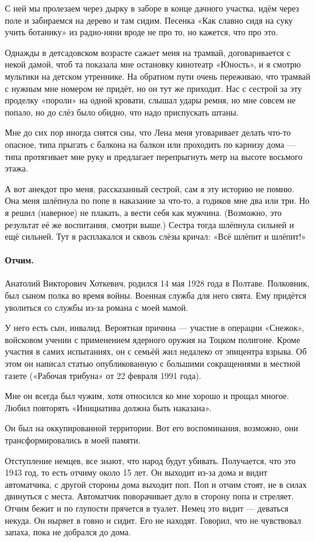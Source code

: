 \documentclass{book}
\begin{document}
С ней мы пролезаем через дырку в заборе в конце дачного участка, идём через поле и забираемся на дерево и там сидим.
Песенка «Как славно сидя на суку учить ботанику» из радио-няни вроде не про то, но кажется, что про это.

Однажды в детсадовском возрасте сажает меня на трамвай,
договаривается с некой дамой, чтоб та показала мне остановку кинотеатр «Юность», 
и я смотрю мультики на детском утреннике.
На обратном пути очень переживаю, что трамвай с нужным мне номером не придёт, но он тут же приходит.
Нас с сестрой за эту проделку «пороли» на одной кровати, слышал удары ремня, но мне совсем не попало, но до слёз было обидно, что надо приспускать штаны.

Мне до сих пор иногда снятся сны, что Лена меня уговаривает делать что-то опасное, типа прыгать с балкона на балкон или проходить по карнизу дома --- типа протягивает мне руку и предлагает перепрыгнуть метр на высоте восьмого этажа.

А вот анекдот про меня, рассказанный сестрой, сам я эту историю не помню.
Она меня шлёпнула по попе в наказание за что-то, а годиков мне два или три.
Но я решил (наверное) не плакать, а вести себя как мужчина.
(Возможно, это результат её же воспитания, смотри выше.)
Сестра тогда шлёпнула сильней и ещё сильней.
Тут я расплакался и сквозь слёзы кричал: «Всё шлёпит и шлёпит!»

\paragraph{Отчим.}
Анатолий Викторович Хоткевич, родился 14 мая 1928 года в Полтаве.
Полковник, был сыном полка во время войны.
Военная служба для него свята.
Ему придётся уволиться со службы из-за романа с моей мамой.

У него есть сын, инвалид.
Вероятная причина --- участие в операции «Снежок», войсковом учении с применением ядерного оружия на Тоцком полигоне.
Кроме участия в самих испытаниях, он с семьёй жил недалеко от эпицентра взрыва.
Об этом он написал статью опубликованную с большими сокращениями в местной газете («Рабочая трибуна» от 22 февраля 1991 года).

Мне он всегда был чужим, хотя относился ко мне хорошо и прощал многое.
Любил повторять «Инициатива должна быть наказана».

Он был на оккупированной территории.
Вот его воспоминания, возможно, они трансформировались в моей памяти.

Отступление немцев, все знают, что народ будут убивать.
Получается, что это 1943 год, то есть отчиму около 15 лет.
Он выходит из-за дома и видит автоматчика, с другой стороны дома выходит поп.
Поп и отчим стоят, не в силах двинуться с места.
Автоматчик поворачивает дуло в сторону попа и стреляет.
Отчим бежит и по глупости прячется в туалет.
Немец это видит --- деваться некуда.
Он ныряет в говно и сидит. 
Его не находят.
Говорил, что не чувствовал запаха, пока не добрался до дома.
\end{document}
